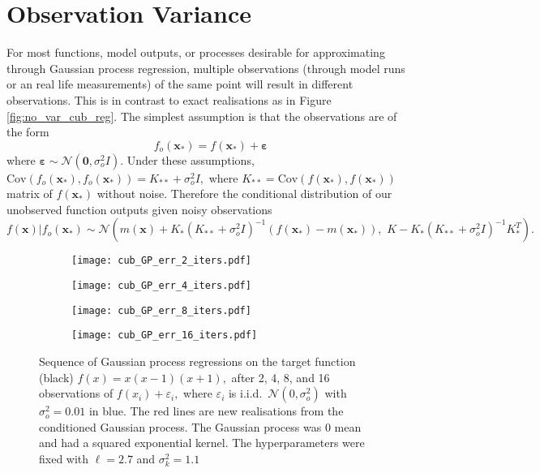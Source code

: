 \section{Observation Variance}

For most functions, model outputs, or processes desirable for
approximating through Gaussian process regression, multiple
observations (through model runs or an real life measurements) of the same point
will result in different observations. This is in contrast to exact realisations
as in Figure \ref{fig:no_var_cub_reg}. The simplest assumption is that the
observations are of the form
$$
    f_o(\mathbf{x}_*) = f(\mathbf{x}_*) + \bm{\varepsilon}
$$
where $\bm{\varepsilon} \sim \mathcal{N}(\mathbf{0}, \sigma^2_o I).$
Under these assumptions,
$\mathrm{Cov}(f_o(\mathbf{x}_*), f_o(\mathbf{x}_*)) = K_{**} + \sigma^2_o I,$
where $K_{**} = \mathrm{Cov}(f(\mathbf{x}_*), f(\mathbf{x}_*))$
matrix of $f(\mathbf{x}_*)$ without noise. Therefore the conditional
distribution of our unobserved function outputs given noisy observations
$$
    f(\mathbf{x}) | f_o(\mathbf{x}_*)
    \sim \mathcal{N}\left(
    m(\mathbf{x}) + K_{*}
    (K_{**} + \sigma^2_o I)^{-1}
    (f(\mathbf{x}_*) - m(\mathbf{x}_*)), \,\,
    K - K_{*}(K_{**} + \sigma^2_o I)^{-1}K_{*}^T
    \right).
$$


\begin{figure}[htbp]
    \centering
    \begin{subfigure}[b]{0.5\textwidth}
        \centering
        \texttt{[image: cub\_GP\_err\_2\_iters.pdf]}
    \end{subfigure}%
    \hfill%
    \begin{subfigure}[b]{0.5\textwidth}
        \centering
        \texttt{[image: cub\_GP\_err\_4\_iters.pdf]}
    \end{subfigure}
    \begin{subfigure}[b]{0.5\textwidth}
        \centering
        \texttt{[image: cub\_GP\_err\_8\_iters.pdf]}
    \end{subfigure}%
    \hfill%
    \begin{subfigure}[b]{0.5\textwidth}
        \centering
        \texttt{[image: cub\_GP\_err\_16\_iters.pdf]}
    \end{subfigure}%
    \caption{
        Sequence of Gaussian process regressions on the target function
        (black) $f(x) = x(x-1)(x+1),$ after 2, 4, 8, and 16 observations of
        $f(x_i) + \varepsilon_i,$ where $\varepsilon_i$ is i.i.d.\
        $\mathcal{N}(0, \sigma^2_o)$ with $\sigma^2_o = 0.01$
        in blue. The red lines are new realisations from the conditioned
        Gaussian process. The Gaussian process was 0 mean and had a squared
        exponential kernel. The hyperparameters were fixed with $\ell = 2.7$
        and $\sigma^2_k = 1.1$
    }
    \label{fig:var_cub_reg}
\end{figure}

